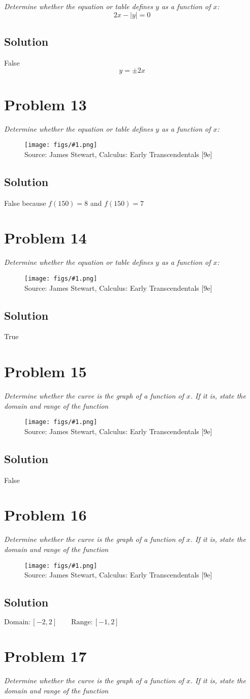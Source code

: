\documentclass[11pt]{article}
\newcommand{\soln}{\subsection*}
\newcommand{\qn}{\textit}
\newcommand{\imagesource}[1]{{\footnotesize Source: #1}}
\newcommand{\imgqn}[1]{
	\begin{figure}[h]
		\centering
		\texttt{[image: figs/\#1.png]}\\
		\imagesource{James Stewart, Calculus: Early Transcendentals [9e]}
	\end{figure}
}
\begin{document}
\qn{Determine whether the equation or table defines $y$ as a function of $x$: $$2x-|y|=0$$}

\soln{Solution}
False
$$y=\pm2x$$

\section*{Problem 13}

\qn{Determine whether the equation or table defines $y$ as a function of $x$:}

\imgqn{1.1.13}

\soln{Solution}
False because $f(150)=8$ and $f(150)=7$

\section*{Problem 14}

\qn{Determine whether the equation or table defines $y$ as a function of $x$:}

\imgqn{1.1.14}

\soln{Solution}
True

\section*{Problem 15}

\qn{Determine whether the curve is the graph of a function of $x$. If it is, state the domain and range of the function}

\imgqn{1.1.15}

\soln{Solution}
False

\section*{Problem 16}

\qn{Determine whether the curve is the graph of a function of $x$. If it is, state the domain and range of the function}

\imgqn{1.1.16}

\soln{Solution}
$\mathrm{Domain}:[-2,2] \qquad\mathrm{Range}:[-1,2]$

\section*{Problem 17}

\qn{Determine whether the curve is the graph of a function of $x$. If it is, state the domain and range of the function}
\end{document}
